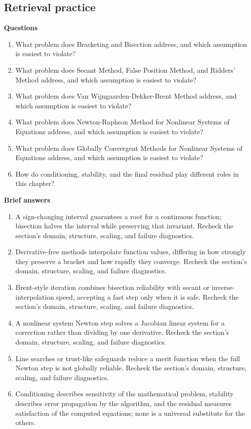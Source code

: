 \documentclass[10pt,letterpaper]{article}
\begin{document}
\subsection*{Retrieval practice}
\textbf{Questions}
\begin{enumerate}
\item What problem does Bracketing and Bisection address, and which assumption is easiest to violate?
\item What problem does Secant Method, False Position Method, and Ridders' Method address, and which assumption is easiest to violate?
\item What problem does Van Wijngaarden-Dekker-Brent Method address, and which assumption is easiest to violate?
\item What problem does Newton-Raphson Method for Nonlinear Systems of Equations address, and which assumption is easiest to violate?
\item What problem does Globally Convergent Methods for Nonlinear Systems of Equations address, and which assumption is easiest to violate?
\item How do conditioning, stability, and the final residual play different roles in this chapter?
\end{enumerate}

\textbf{Brief answers}
\begin{enumerate}
\item A sign-changing interval guarantees a root for a continuous function; bisection halves the interval while preserving that invariant. Recheck the section's domain, structure, scaling, and failure diagnostics.
\item Derivative-free methods interpolate function values, differing in how strongly they preserve a bracket and how rapidly they converge. Recheck the section's domain, structure, scaling, and failure diagnostics.
\item Brent-style iteration combines bisection reliability with secant or inverse-interpolation speed, accepting a fast step only when it is safe. Recheck the section's domain, structure, scaling, and failure diagnostics.
\item A nonlinear system Newton step solves a Jacobian linear system for a correction rather than dividing by one derivative. Recheck the section's domain, structure, scaling, and failure diagnostics.
\item Line searches or trust-like safeguards reduce a merit function when the full Newton step is not globally reliable. Recheck the section's domain, structure, scaling, and failure diagnostics.
\item Conditioning describes sensitivity of the mathematical problem, stability describes error propagation by the algorithm, and the residual measures satisfaction of the computed equations; none is a universal substitute for the others.
\end{enumerate}
\end{document}
